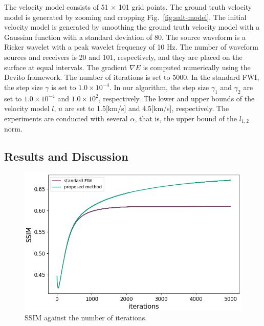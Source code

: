 The velocity model consists of 51 $\times$ 101 grid points.
The ground truth velocity model is generated by zooming and cropping Fig.~\ref{fig:salt-model}.
The initial velocity model is generated by smoothing the ground truth velocity model with a Gaussian function with a standard deviation of 80.
The source waveform is a Ricker wavelet with a peak wavelet frequency of 10 Hz.
The number of waveform sources and receivers is 20 and 101, respectively, and they are placed on the surface at equal intervals.
The gradient $\nabla E$ is computed numerically using the Devito framework\cite{devito}.
The number of iterations is set to 5000.
In the standard FWI, the step size $\gamma$ is set to $1.0 \times 10^{-4}$.
In our algorithm, the step size $\gamma_1$ and $\gamma_2$ are set to $1.0 \times 10^{-4}$ and $1.0 \times 10^2$, respectively.
The lower and upper bounds of the velocity model $l$, $u$ are set to 1.5[km/s] and 4.5[km/s], respectively.
The experiments are conducted with several $\alpha$, that is, the upper bound of the $l_{1,2}$ norm.


\subsection{Results and Discussion}\label{subsec:results-and-discussion}

\begin{figure}[htbp]
    \centering
    \includegraphics[width=\linewidth]{public/iters-ssim}
    \caption{SSIM against the number of iterations.}
    \label{fig:iters-ssim}
\end{figure}


